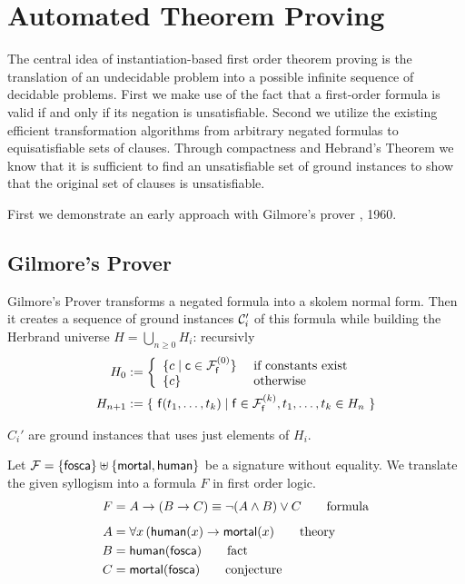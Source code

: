 
\chapter{Automated Theorem Proving}



The central idea of instantiation-based first order theorem proving is the
translation of an undecidable problem into a possible infinite sequence of decidable problems.
First we make use of the fact that a first-order formula is valid if and only if its negation is unsatisfiable.
Second we utilize the existing efficient transformation algorithms from arbitrary negated formulas to equisatisfiable sets of clauses.
Through compactness and Hebrand's Theorem we know that it is sufficient to find an unsatisfiable set of ground instances 
to show that the original set of clauses is unsatisfiable. 


First we demonstrate an early approach with Gilmore's prover \cite{5392528}, 1960. 

\section{Gilmore's Prover}

Gilmore's Prover transforms a negated formula into a skolem normal form.
Then it creates a sequence of ground instances ${\mathcal C}_i'$ of this formula while building the Herbrand universe 
$H = \bigcup_{n\geq 0} H_i$:
recursivly
\begin{align*}
H_0 &:= \left\{ 
	\begin{array}{ll}
	\{ c \mid \mc\in\mcFfn[0] \} 
	&\text{if constants exist}\\
	\{ c \}
	&\text{otherwise}
	\end{array}
\right. 
\\
H_{n+1} &:= \{\  
	\mf(t_1,\ldots,t_k) \mid
	\mf\in\mcFfn[k],
	t_1,\ldots,t_k \in H_n
\ \}
\end{align*}

$C_i'$ are ground instances that uses just elements of $H_i$. 





\begin{example}
	Let ${\mathcal F} = \{ \mathsf{fosca} \} \uplus \{ \mathsf{mortal}, \mathsf{human} \}$ be a signature without equality. 
	We translate the given syllogism into a formula $F$ in first order logic.
	\begin{align*}
		F &= A \rightarrow (B \rightarrow C) \equiv \lnot(A\land B) \lor C 
		\tag*{formula}
		\\[0.5em]
		A &= \forall x\, ( \mathsf{human}(x) \rightarrow \mathsf{mortal}(x) 
		\tag*{theory}
		\\
		B &= \mathsf{human}(\mathsf{fosca}) 
		\tag*{fact}
		\\
		C &= \mathsf{mortal}(\mathsf{fosca})
		\tag*{conjecture}
	\end{align*}
\end{example}
 

